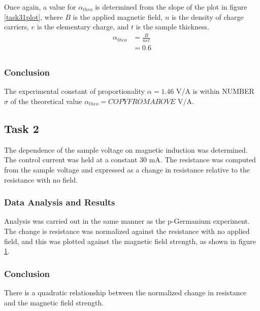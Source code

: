 \documentclass[a4paper]{article}
\begin{document}
Once again, a value for $\alpha_{theo}$ is determined from the slope of the plot in figure \ref{task31plot}, where $B$ is the applied magnetic field, $n$ is the density of charge carriers, $e$ is the elementary charge, and $t$ is the sample thickness.
\begin{align*}
\alpha_{theo} &= \frac{B}{net} \\
			  &= 0.6 \\
\end{align*}

\subsubsection{Conclusion}
The experimental constant of proportionality $\alpha = 1.46 $ V/A is within NUMBER $\sigma$ of the theoretical value $\alpha_{theo} = COPYFROMABOVE$ V/A.

\subsection{Task 2}

\qq The dependence of the sample voltage on magnetic induction was determined. The control current was held at a constant
30 mA. The resistance was computed from the sample voltage and expressed as a change in resistance relative to the resistance with no field.

\subsubsection{Data Analysis and Results}
Analysis was carried out in the same manner as the p-Germanium experiment. The change is resistance was normalized against the resistance with no applied field, and this was plotted against the magnetic field strength, as shown in figure \ref{task32plot}.

\begin{figure}[H]
\centering
\label{task32plot}
\end{figure}


\subsubsection{Conclusion}
There is a quadratic relationship between the normalized change in resistance and the magnetic field strength.
\end{document}
